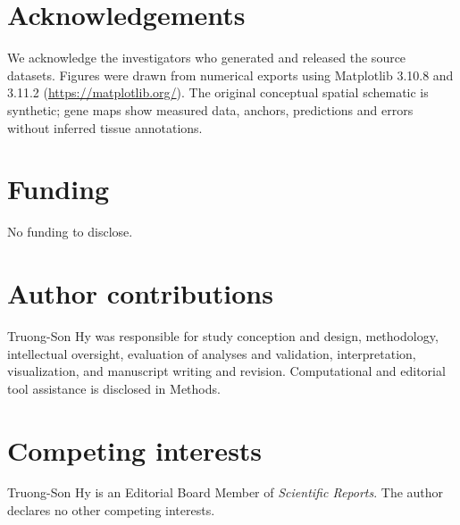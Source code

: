 \section{Acknowledgements}
We acknowledge the investigators who generated and released the source datasets. Figures were drawn from numerical exports using Matplotlib 3.10.8 and 3.11.2 (\url{https://matplotlib.org/}). The original conceptual spatial schematic is synthetic; gene maps show measured data, anchors, predictions and errors without inferred tissue annotations.
\section{Funding}
No funding to disclose.
\section{Author contributions}
Truong-Son Hy was responsible for study conception and design, methodology, intellectual oversight, evaluation of analyses and validation, interpretation, visualization, and manuscript writing and revision. Computational and editorial tool assistance is disclosed in Methods.
\section{Competing interests}
Truong-Son Hy is an Editorial Board Member of \textit{Scientific Reports}. The author declares no other competing interests.
\nolinenumbers



